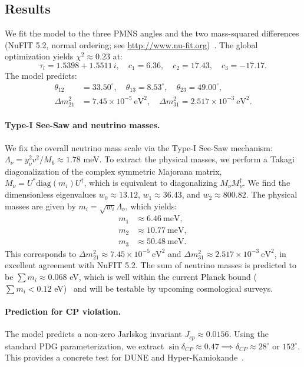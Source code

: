\documentclass[12pt,a4paper]{article}
\numberwithin{equation}{section}
\begin{document}
\subsection{Results}
We fit the model to the three PMNS angles and the two mass-squared differences (NuFIT 5.2, normal ordering; see \url{http://www.nu-fit.org})~\cite{NuFIT2020}. The global optimization yields \(\chi^2 \approx 0.23\) at:
\begin{equation}
\tau_l = 1.5398 + 1.5511\,i, \quad c_1 = 6.36, \quad c_2 = 17.43, \quad c_3 = -17.17.
\end{equation}
The model predicts:
\begin{align}
\theta_{12} &= 33.50^\circ, \quad \theta_{13} = 8.53^\circ, \quad \theta_{23} = 49.00^\circ, \\
\Delta m^2_{21} &= 7.45 \times 10^{-5}~\text{eV}^2, \quad \Delta m^2_{31} = 2.517 \times 10^{-3}~\text{eV}^2.
\end{align}

\paragraph{Type-I See-Saw and neutrino masses.}
We fix the overall neutrino mass scale via the Type-I See-Saw mechanism: \(\Lambda_\nu = y_\nu^2 v^2 / M_6 \approx 1.78\) meV. To extract the physical masses, we perform a Takagi diagonalization of the complex symmetric Majorana matrix, \(M_\nu = U^* \mathrm{diag}(m_i) U^\dagger\), which is equivalent to diagonalizing \(M_\nu M_\nu^\dagger\). We find the dimensionless eigenvalues \(w_0 \approx 13.12\), \(w_1 \approx 36.43\), and \(w_2 \approx 800.82\). The physical masses are given by \(m_i = \sqrt{w_i} \Lambda_\nu\), which yields:
\begin{align}
m_1 &\approx 6.46~\text{meV}, \\
m_2 &\approx 10.77~\text{meV}, \\
m_3 &\approx 50.48~\text{meV}.
\end{align}
This corresponds to \(\Delta m^2_{21} \approx 7.45 \times 10^{-5}~\text{eV}^2\) and \(\Delta m^2_{31} \approx 2.517 \times 10^{-3}~\text{eV}^2\), in excellent agreement with NuFIT 5.2. The sum of neutrino masses is predicted to be \(\sum m_i \approx 0.068\) eV, which is well within the current Planck bound (\(\sum m_i < 0.12\) eV)~\cite{Planck2018} and will be testable by upcoming cosmological surveys.

\paragraph{Prediction for CP violation.}
The model predicts a non-zero Jarlskog invariant \(J_{cp} \approx 0.0156\). Using the standard PDG parameterization, we extract \(\sin\delta_{CP} \approx 0.47 \implies \delta_{CP} \approx 28^\circ\) or \(152^\circ\). This provides a concrete test for DUNE and Hyper-Kamiokande~\cite{DUNE2024}.
\end{document}
